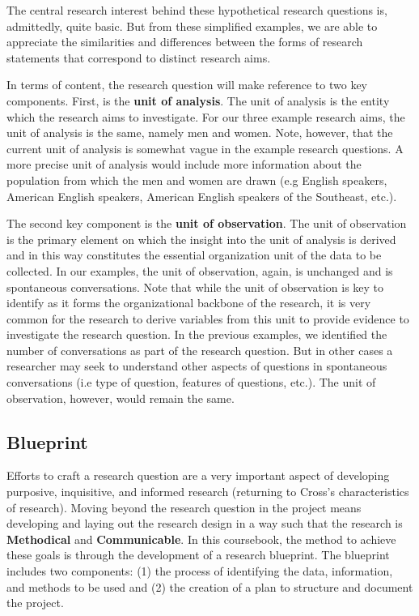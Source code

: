 \documentclass[
]{article}
\begin{document}
The central research interest behind these hypothetical research questions is, admittedly, quite basic. But from these simplified examples, we are able to appreciate the similarities and differences between the forms of research statements that correspond to distinct research aims.

In terms of content, the research question will make reference to two key components. First, is the \textbf{unit of analysis}. The unit of analysis is the entity which the research aims to investigate. For our three example research aims, the unit of analysis is the same, namely men and women. Note, however, that the current unit of analysis is somewhat vague in the example research questions. A more precise unit of analysis would include more information about the population from which the men and women are drawn (e.g English speakers, American English speakers, American English speakers of the Southeast, etc.).

The second key component is the \textbf{unit of observation}. The unit of observation is the primary element on which the insight into the unit of analysis is derived and in this way constitutes the essential organization unit of the data to be collected. In our examples, the unit of observation, again, is unchanged and is spontaneous conversations. Note that while the unit of observation is key to identify as it forms the organizational backbone of the research, it is very common for the research to derive variables from this unit to provide evidence to investigate the research question. In the previous examples, we identified the number of conversations as part of the research question. But in other cases a researcher may seek to understand other aspects of questions in spontaneous conversations (i.e type of question, features of questions, etc.). The unit of observation, however, would remain the same.

\hypertarget{blueprint}{%
\subsection{Blueprint}\label{blueprint}}

Efforts to craft a research question are a very important aspect of developing purposive, inquisitive, and informed research (returning to Cross's characteristics of research). Moving beyond the research question in the project means developing and laying out the research design in a way such that the research is \textbf{Methodical} and \textbf{Communicable}. In this coursebook, the method to achieve these goals is through the development of a research blueprint. The blueprint includes two components: (1) the process of identifying the data, information, and methods to be used and (2) the creation of a plan to structure and document the project.
\end{document}
